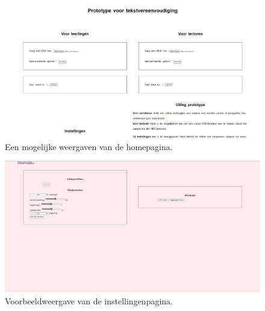 \chapter{}%
\label{ch:screenshots-prototype}


\begin{center}
	\begin{figure}[H]
		\includegraphics[width=\linewidth]{img/proto-homescreen.png}
		\caption{Een mogelijke weergaven van de homepagina.}		
		\label{img:homepage}
	\end{figure}
\end{center}

\begin{center}
	\begin{figure}[H]
		\includegraphics[width=\linewidth]{img/website-instellingen.png}
		\caption{Voorbeeldweergave van de instellingenpagina.}
		\label{img:website-instellingen}
	\end{figure}
\end{center}

